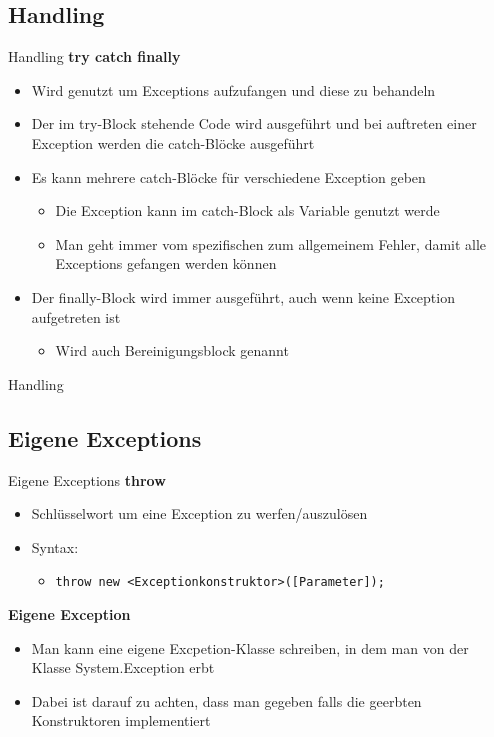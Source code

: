 \subsection{Handling}
\begin{frame}{Handling}
	\textbf{try catch finally}\\
	\begin{itemize}
		\item Wird genutzt um Exceptions aufzufangen und diese zu behandeln
		\item Der im \alert{try}-Block stehende Code wird ausgeführt und bei auftreten einer Exception werden die \alert{catch}-Blöcke ausgeführt
		\item Es kann mehrere \alert{catch}-Blöcke für verschiedene Exception geben
		\begin{itemize}
			\item Die Exception kann im \alert{catch}-Block als Variable genutzt werde
			\item Man geht immer vom spezifischen zum allgemeinem Fehler, damit alle Exceptions gefangen werden können
		\end{itemize}
		\item Der \alert{finally}-Block wird immer ausgeführt, auch wenn keine Exception aufgetreten ist
		\begin{itemize}
			\item Wird auch Bereinigungsblock genannt
		\end{itemize}
	\end{itemize}
\end{frame}

\begin{frame}{Handling}
		
\end{frame}

\subsection{Eigene Exceptions}
\begin{frame}{Eigene Exceptions}
	\textbf{throw}\\
	\begin{itemize}
		\item Schlüsselwort um eine Exception zu werfen/auszulösen
		\item Syntax:
		\begin{itemize}
			\item \texttt{throw new \alert{<Exceptionkonstruktor>}(\alert{[Parameter]});}
		\end{itemize}
	\end{itemize}
	\textbf{Eigene Exception}\\
	\begin{itemize}
		\item Man kann eine eigene Excpetion-Klasse schreiben, in dem man von der Klasse \alert{System.Exception} erbt
		\item Dabei ist darauf zu achten, dass man gegeben falls die geerbten Konstruktoren implementiert
	\end{itemize}
\end{frame}

